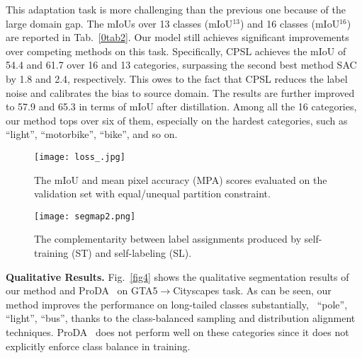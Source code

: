 \documentclass[10pt,twocolumn,letterpaper]{article}
\begin{document}
	\vspace{0.1em} This adaptation task is more challenging than the previous one because of the large domain gap. The mIoUs over 13 classes (mIoU$^{13}$) and 16 classes (mIoU$^{16}$) are reported in Tab.~\ref{0tab2}. Our model still achieves significant improvements over competing methods on this task. Specifically, CPSL achieves the mIoU of 54.4 and 61.7 over 16 and 13 categories, surpassing the second best method SAC~\cite{araslanov2021self} by 1.8 and 2.4, respectively. This owes to the fact that CPSL reduces the label noise and calibrates the bias to source domain. The results are further improved to 57.9 and 65.3 in terms of mIoU after distillation. Among all the 16 categories, our method tops over six of them, especially on the hardest categories, such as ``light'', ``motorbike'', ``bike'', and so on. 


	\begin{figure}
		\vspace{-0.6em}\hspace{-0.8em}
		\texttt{[image: loss\_.jpg]}\\
		\vspace{-2.5em}
		\caption{The mIoU and mean pixel accuracy (MPA) scores evaluated on the validation set with equal/unequal partition constraint.}
		\label{fig7}
		\vspace{-1em}
	\end{figure}
	
	\begin{figure*}
		\centering \vspace{-1.5em}
		\texttt{[image: segmap2.png]}\\
		\vspace{-1.5em}
		\caption{The complementarity between label assignments produced by self-training (ST) and self-labeling (SL).}
		\label{fig3}
		\vspace{-1em}
	\end{figure*}
	
	\vspace{0.2em}	\noindent\textbf{Qualitative Results.}
	Fig.~\ref{fig4} shows the qualitative segmentation results of our method and ProDA~\cite{zhang2021prototypical} on GTA5$\to$Cityscapes task. As can be seen, our method improves the performance on long-tailed classes substantially, \eg~``pole'', ``light'', ``bus'', thanks to the class-balanced sampling and distribution alignment techniques. ProDA~\cite{zhang2021prototypical} does not perform well on these categories since it does not explicitly enforce class balance in training. 
\end{document}
